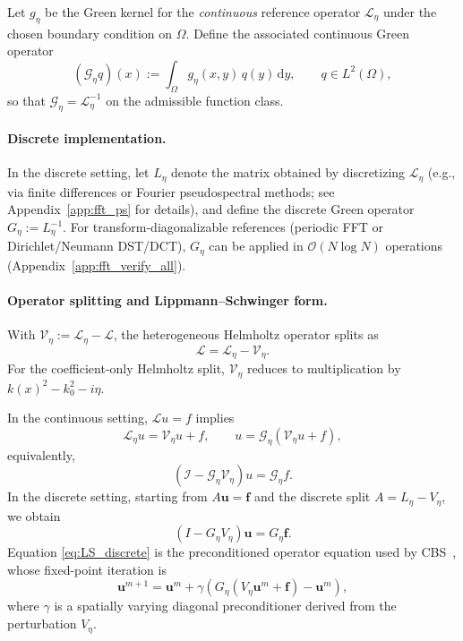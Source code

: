 \documentclass{article}
\theoremstyle{plain}
\theoremstyle{remark}
\begin{document}
Let $g_\eta$ be the Green kernel for the \emph{continuous} reference operator $\mathcal{L}_\eta$ under the chosen boundary condition on $\Omega$. Define the associated continuous Green operator
\begin{equation}
(\mathcal{G}_\eta q)(x) := \int_{\Omega} g_\eta(x,y)\,q(y)\,\mathrm{d}y,
\qquad q\in L^2(\Omega),
\label{eq:G_conv}
\end{equation}
so that $\mathcal{G}_\eta = \mathcal{L}_\eta^{-1}$ on the admissible function class.

\paragraph{Discrete implementation.}
In the discrete setting, let $L_\eta$ denote the matrix obtained by discretizing $\mathcal{L}_\eta$ (e.g., via finite differences or Fourier pseudospectral methods; see Appendix~\ref{app:fft_ps} for details), and define the discrete Green operator $G_\eta := L_\eta^{-1}$. For transform-diagonalizable references (periodic FFT or Dirichlet/Neumann DST/DCT), $G_\eta$ can be applied in $\mathcal{O}(N\log N)$ operations (Appendix~\ref{app:fft_verify_all}).

\paragraph{Operator splitting and Lippmann--Schwinger form.}
With $\mathcal{V}_\eta := \mathcal{L}_\eta - \mathcal{L}$, the heterogeneous Helmholtz operator splits as
\begin{equation}
\mathcal{L} = \mathcal{L}_\eta - \mathcal{V}_\eta.
\label{eq:A_split}
\end{equation}
For the coefficient-only Helmholtz split, $\mathcal{V}_\eta$ reduces to multiplication by $k(x)^2-k_0^2-i\eta$.

In the continuous setting, $\mathcal{L}u=f$ implies
\begin{equation}
\mathcal{L}_\eta u = \mathcal{V}_\eta u + f,
\qquad
u = \mathcal{G}_\eta(\mathcal{V}_\eta u + f),
\end{equation}
equivalently,
\begin{equation}
(\mathcal{I} - \mathcal{G}_\eta \mathcal{V}_\eta)u = \mathcal{G}_\eta f.
\end{equation}
In the discrete setting, starting from $A\bm u=\bm f$ and the discrete split $A=L_\eta - V_\eta$, we obtain
\begin{equation}
(I - G_\eta V_\eta)\bm u = G_\eta \bm f.
\label{eq:LS_discrete}
\end{equation}
Equation \eqref{eq:LS_discrete} is the preconditioned operator equation used by CBS~\cite{osnabrugge2016convergent}, whose fixed-point iteration is
\begin{equation}
\bm u^{m+1}
=
\bm u^m + \gamma\!\left(G_\eta(V_\eta \bm u^m + \bm f)-\bm u^m\right),
\label{eq:CBS}
\end{equation}
where $\gamma$ is a spatially varying diagonal preconditioner derived from the perturbation $V_\eta$.
\end{document}
